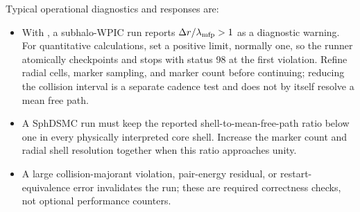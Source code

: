 \documentclass[11pt]{article}
\newcommand{\code}[1]{\texttt{\detokenize{#1}}}
\newcommand{\codesource}[3]{%
  \par\smallskip\noindent
  \textbf{Listing ownership.}\space
  \textbf{Task or tool:} #1.\space
  \textbf{Implementation:} #2.\space
  \textbf{Role:} #3.
  \par\nopagebreak\smallskip
}
\newif\ifvenusfullcpu
\begin{document}
Typical operational diagnostics and responses are:
\begin{itemize}
\ifvenusfullcpu
\item Boundary occupancy at a \(w\)-edge calls for a larger \code{w_max}, an
improved IC, or an analytic workflow with adaptive \(w\).
\item A BP collision substep-cap event calls for a smaller timestep or
collision strength, or a verified increase in the substep cap.  The relevant
keys are:
\codesource{Grid Boltzmann--Poisson collision tasks}
  {\path{cpu/include/ev/config.hpp} and
   \path{cpu/include/ev/solver_evolution.hpp}}
  {Timestep and collision-substep controls used when diagnosing a cap event}
\begin{lstlisting}
dt_max
bp_collision_strength
bp_collision_max_substeps
\end{lstlisting}
\item A BP run has \code{op_collision_over_vlasov} much larger than one: it is
collision dominated.
\item A BP run has \code{op_collision_over_vlasov} near zero throughout: it is
effectively collisionless on the simulated interval.
\item A non-MPI executable uses \code{--ntasks=1}; the MPI target supports a
multi-rank Slurm layout.
\item A distributed restart relaunches with the MPI rank count recorded when
the restart was written.
\item An SLDG run with nonzero \code{quadrature_fallback_mass} should reduce
\code{dt}, increase geometric refinement only with measured need, and verify
that the fraction decreases with resolution; a failed carrier ledger is never
repaired by normalization.
\else
\item With \code{--subhalo-locality-maximum-ratio 0}, a subhalo-WPIC run
reports \(\Delta r/\lambda_{\rm mfp}>1\) as a diagnostic warning.  For
quantitative calculations, set a positive limit, normally one, so the runner
atomically checkpoints and
stops with status 98 at the first violation.  Refine radial cells, marker
sampling, and marker count before continuing; reducing the collision interval
is a separate cadence test and does not by itself resolve a mean free path.
\item A SphDSMC run must keep the reported shell-to-mean-free-path ratio below
one in every physically interpreted core shell.  Increase the marker count
and radial shell resolution together when this ratio approaches unity.
\item A large collision-majorant violation, pair-energy residual, or
restart-equivalence error invalidates the run; these are required correctness
checks, not optional performance counters.
\fi
\end{itemize}
\end{document}
